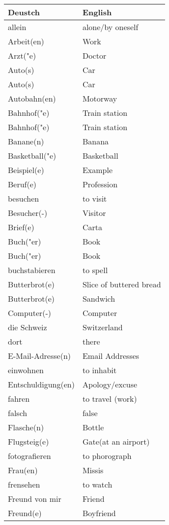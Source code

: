 \documentclass{article}
\renewcommand{\arraystretch}{1}
\begin{document}
\begin{minipage}{0.48\textwidth}
    \centering
    \renewcommand{\arraystretch}{1.5}
    \begin{tabular}{|>{\raggedright\arraybackslash}p{3.5cm}|>{\raggedright\arraybackslash}p{3.5cm}|}
        \hline
        \rowcolor{gray!20} \textbf{Deustch} & \textbf{English} \\
        \hline
        allein & alone/by oneself \\\hline
        Arbeit(en) & Work \\\hline
        Arzt("e) & Doctor \\\hline
        Auto(s) & Car \\\hline
        Auto(s) & Car \\\hline
        Autobahn(en) & Motorway \\\hline
        Bahnhof("e) & Train station \\\hline
        Bahnhof("e) & Train station \\\hline
        Banane(n) & Banana \\\hline
        Basketball("e) & Basketball \\\hline
        Beispiel(e) & Example \\\hline
        Beruf(e) & Profession \\\hline
        besuchen & to visit \\\hline
        Besucher(-) & Visitor \\\hline
        Brief(e) & Carta \\\hline
        Buch("er) & Book \\\hline
        Buch("er) & Book \\\hline
        buchstabieren & to spell \\\hline
        Butterbrot(e) & Slice of buttered bread \\\hline
        Butterbrot(e) & Sandwich \\\hline
        Computer(-) & Computer \\\hline
        die Schweiz & Switzerland \\\hline
        dort & there \\\hline
        E-Mail-Adresse(n) & Email Addresses \\\hline
        einwohnen & to inhabit \\\hline
        Entschuldigung(en) & Apology/excuse \\\hline
        fahren & to travel (work) \\\hline
        falsch & false \\\hline
        Flasche(n) & Bottle \\\hline
        Flugsteig(e) & Gate(at an airport) \\\hline
        fotografieren & to phorograph \\\hline
        Frau(en) & Missis \\\hline
        frensehen & to watch  \\\hline
        Freund von mir & Friend \\\hline
        Freund(e) & Boyfriend \\\hline
    \end{tabular}
\end{minipage}%
\end{document}
